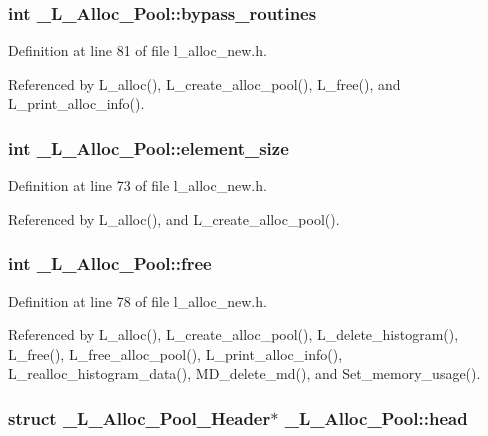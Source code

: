 \subsubsection{\setlength{\rightskip}{0pt plus 5cm}int \bf{\_\-L\_\-Alloc\_\-Pool::bypass\_\-routines}}\label{struct__L__Alloc__Pool_b064ceb66678310523b3f8dcd1b77a85}




Definition at line 81 of file l\_\-alloc\_\-new.h.

Referenced by L\_\-alloc(), L\_\-create\_\-alloc\_\-pool(), L\_\-free(), and L\_\-print\_\-alloc\_\-info().
\subsubsection{\setlength{\rightskip}{0pt plus 5cm}int \bf{\_\-L\_\-Alloc\_\-Pool::element\_\-size}}\label{struct__L__Alloc__Pool_bd42b0f45f97bc5ed238c327c849f1c4}




Definition at line 73 of file l\_\-alloc\_\-new.h.

Referenced by L\_\-alloc(), and L\_\-create\_\-alloc\_\-pool().
\subsubsection{\setlength{\rightskip}{0pt plus 5cm}int \bf{\_\-L\_\-Alloc\_\-Pool::free}}\label{struct__L__Alloc__Pool_7fb9eac11f7ff9b645bd10c1192d065e}




Definition at line 78 of file l\_\-alloc\_\-new.h.

Referenced by L\_\-alloc(), L\_\-create\_\-alloc\_\-pool(), L\_\-delete\_\-histogram(), L\_\-free(), L\_\-free\_\-alloc\_\-pool(), L\_\-print\_\-alloc\_\-info(), L\_\-realloc\_\-histogram\_\-data(), MD\_\-delete\_\-md(), and Set\_\-memory\_\-usage().
\subsubsection{\setlength{\rightskip}{0pt plus 5cm}struct \bf{\_\-L\_\-Alloc\_\-Pool\_\-Header}$\ast$ \bf{\_\-L\_\-Alloc\_\-Pool::head}}\label{struct__L__Alloc__Pool_dfeed14445661ae708c5d1575f669365}




